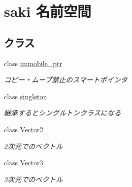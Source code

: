 \hypertarget{namespacesaki}{}\section{saki 名前空間}
\label{namespacesaki}
\subsection*{クラス}
\begin{DoxyCompactItemize}
\item 
class \mbox{\hyperlink{classsaki_1_1immobile__ptr}{immobile\+\_\+ptr}}
\begin{DoxyCompactList}\small\item\em コピー・ムーブ禁止のスマートポインタ \end{DoxyCompactList}\item 
class \mbox{\hyperlink{classsaki_1_1singleton}{singleton}}
\begin{DoxyCompactList}\small\item\em 継承するとシングルトンクラスになる \end{DoxyCompactList}\item 
class \mbox{\hyperlink{classsaki_1_1_vector2}{Vector2}}
\begin{DoxyCompactList}\small\item\em 2次元でのベクトル \end{DoxyCompactList}\item 
class \mbox{\hyperlink{classsaki_1_1_vector3}{Vector3}}
\begin{DoxyCompactList}\small\item\em 3次元でのベクトル \end{DoxyCompactList}\end{DoxyCompactItemize}
